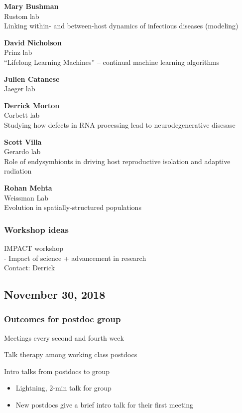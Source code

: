 \documentclass[10,portrait]{article}
\begin{document}
\textbf{Mary Bushman}\\
Rustom lab\\
Linking within- and between-host dynamics of infectious diseases
(modeling)

\textbf{David Nicholson}\\
Prinz lab\\
``Lifelong Learning Machines'' -- continual machine learning algorithms

\textbf{Julien Catanese}\\
Jaeger lab

\textbf{Derrick Morton}\\
Corbett lab\\
Studying how defects in RNA processing lead to neurodegenerative
disesase

\textbf{Scott Villa}\\
Gerardo lab\\
Role of endysymbionts in driving host reproductive isolation and
adaptive radiation

\textbf{Rohan Mehta}\\
Weissman Lab\\
Evolution in spatially-structured populations

\subsubsection{Workshop ideas}\label{workshop-ideas}

IMPACT workshop\\
- Impact of science + advancement in research\\
Contact: Derrick

\newpage  

\subsection{November 30, 2018}\label{november-30-2018}

\subsubsection{Outcomes for postdoc
group}\label{outcomes-for-postdoc-group}

Meetings every second and fourth week

Talk therapy among working class postdocs

Intro talks from postdocs to group

\begin{itemize}
\item
  Lightning, 2-min talk for group
\item
  New postdocs give a brief intro talk for their first meeting
\end{itemize}
\end{document}

